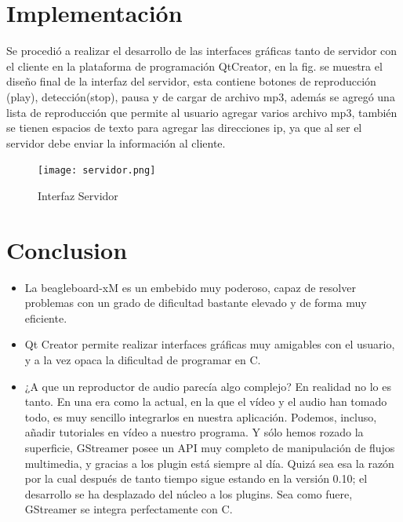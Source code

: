 \documentclass[%
	final,
	reprint,
	notitlepage,
	narroweqnarray,
	inline,
	twoside,
        invited,
	]{ieee}
\begin{document}
\section{Implementación}

Se procedió a realizar el desarrollo de las interfaces gráficas tanto de servidor con el cliente en la plataforma de programación QtCreator, en la fig. se muestra el diseño final de la interfaz del servidor, esta contiene botones de reproducción (play), detección(stop), pausa y de cargar de archivo mp3, además se agregó una lista de reproducción que permite al usuario agregar varios archivo mp3, también se tienen espacios de texto para agregar las direcciones ip, ya que al ser el servidor debe enviar la información al cliente.

\begin{figure}[hbtp]
\texttt{[image: servidor.png]}
\caption{Interfaz Servidor}
\end{figure}



\section{Conclusion}

\begin{itemize}
\item La beagleboard-xM es un embebido muy poderoso, capaz de resolver problemas con un grado de dificultad bastante elevado y de forma muy eficiente.
\item Qt Creator permite realizar interfaces gráficas muy amigables con el usuario, y a la vez opaca la dificultad de programar en C.
\item ¿A que un reproductor de audio parecía algo complejo? En realidad no lo es tanto. En una era como la actual, en la que el vídeo y el audio han tomado todo, es muy sencillo integrarlos en nuestra aplicación. Podemos, incluso, añadir tutoriales en vídeo a nuestro programa. Y sólo hemos rozado la superficie, GStreamer posee un API muy completo de manipulación de flujos multimedia, y gracias a los plugin está siempre al día. Quizá sea esa la razón por la cual después de tanto tiempo sigue estando en la versión 0.10; el desarrollo se ha desplazado del núcleo a los plugins. Sea como fuere, GStreamer se integra perfectamente con C.
\end{itemize}
\end{document}
